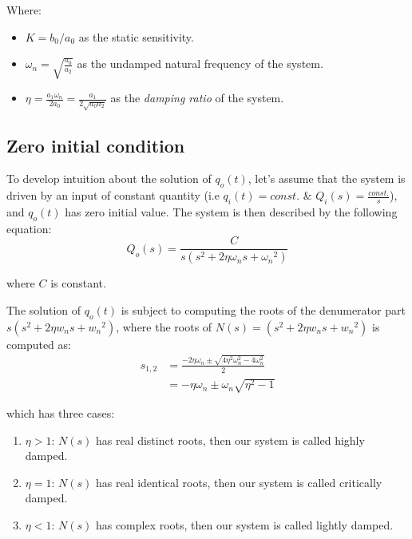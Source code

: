 \documentclass[a4paper,11pt]{book}
\begin{document}
Where: \begin{itemize}
\item $K = b_0/a_0$ as the static sensitivity.
\item $\omega_n=\sqrt{\frac{a_0}{a_2}}$ as the undamped natural frequency of the system.
\item $\eta = \frac{a_1 \omega_n}{ 2a_0} = \frac{a_1}{2 \sqrt{a_0a_2}}$ as the \emph{damping ratio} of the system.
\end{itemize} 

\subsection*{Zero initial condition}
To develop intuition about the solution of $q_o(t)$, let's assume that the system is driven by an input of constant quantity (i.e $q_i(t)=const.$ \& $Q_i(s)=\frac{const.}{s}$), and $q_o(t)$ has zero initial value. The system is then described by the following equation:
\begin{equation}\label{eqn:zi-second-order}
Q_o(s) = \frac{ C }{ s(s^2 + 2 \eta \omega_n s + {\omega_n}^2)}
\end{equation}

where $C$ is constant.

The solution of $q_o(t)$ is subject to computing the roots of the denumerator part $s(s^2 + 2 \eta w_n s + {w_n}^2)$, where the roots of  $N(s)=(s^2 + 2 \eta w_n s + {w_n}^2)$ is computed as:
\begin{align}
s_{1,2} &= \frac{-2\eta \omega_n \pm \sqrt{4\eta^2 \omega_n^2 - 4 \omega_n^2}}{2} \\
 &= -\eta \omega_n \pm \omega_n \sqrt{\eta^2 - 1}
\end{align}

which has three cases:
\begin{enumerate}
\item $\eta > 1$: $N(s)$ has real distinct roots, then our system is called highly damped.
\item $\eta = 1$: $N(s)$ has real identical roots, then our system is called critically damped.
\item $\eta < 1$: $N(s)$ has complex roots, then our system is called lightly damped.
\end{enumerate}
\end{document}
